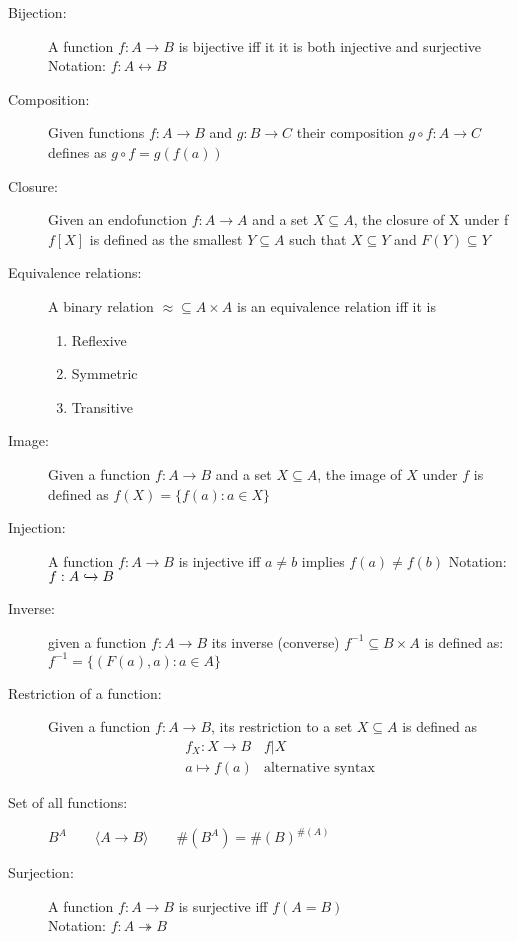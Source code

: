 \documentclass[12pt]{article}
\begin{document}
\begin{description}

\item[Bijection:] A function $f: A \rightarrow B$ is bijective iff it it is both injective and surjective  Notation: $f: A \longleftrightarrow  B$

\item[Composition:] Given functions $f: A \rightarrow B$ and $g: B \rightarrow C$ their composition $g \circ f: A \rightarrow C$ defines as $g \circ f = g(f(a))$

\item[Closure:] Given an endofunction $f: A \rightarrow A$ and a set $X \subseteq A$, the closure of X under f $f[X]$ is defined as the smallest $Y \subseteq A$ such that $ X \subseteq Y$ and $F(Y) \subseteq Y$


\item[Equivalence relations:] A binary relation $\approx \subseteq A \times A$ is an equivalence relation iff it is
	\begin{enumerate}
	\item Reflexive
	\item Symmetric
	\item Transitive
	\end{enumerate}	

\item[Image:] Given a function $f: A \rightarrow B$ and a set $X \subseteq A$, the image of $X$ under $f$ is defined as $f(X) = \{f(a): a \in X\}$	
	
\item[Injection:] A function $f: A \rightarrow B$ is injective iff $a \neq b$ implies $f(a) \neq f(b)$ Notation: $f: A \xhookrightarrow{} B$

\item[Inverse:] given a function $f: A \rightarrow B$ its inverse (converse) $f^{-1} \subseteq B \times A$ is defined as: $f^{-1} = \{ (F(a),a): a \in A \}$

\item[Restriction of a function:] Given a function $f: A \rightarrow B$, its restriction to a set $X \subseteq A$ is defined as \[ \begin{array}{cc}
f_X : X \rightarrow B & f | X \\
a \mapsto f(a) & \textrm{alternative syntax}
\end{array} \]

\item[Set of all functions:] $B^A \qquad  \langle A \rightarrow B \rangle \qquad \# (B^A) = \#(B)^{\#(A)}$

\item[Surjection:] A function $f: A \rightarrow B$ is surjective iff $f(A = B)$ \\ Notation: $f: A \twoheadrightarrow  B$

\end{description}
\end{document}
